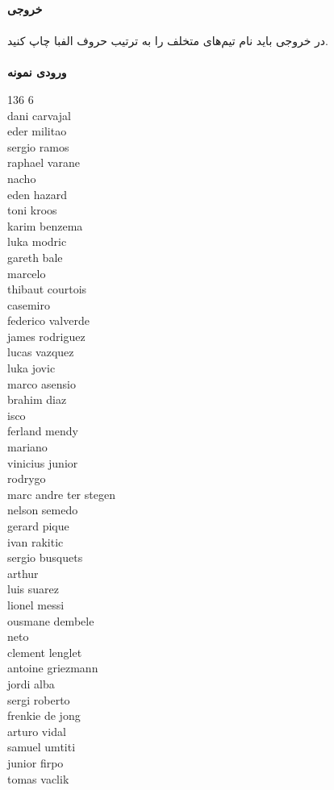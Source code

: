\documentclass[]{article}
\newcommand{\inputsample}[1]{
    ~\\
    \textbf{ورودی نمونه}
    ~\\
    \begin{tcolorbox}[breakable,boxrule=0pt]
        \begin{latin}
            \large{
                #1
            }
        \end{latin}
    \end{tcolorbox}
}
\begin{document}
\textbf{خروجی}
\\\\
در خروجی باید نام تیم‌های متخلف را به ترتیب حروف الفبا چاپ کنید.\\
\inputsample{
136 6\\
dani carvajal\\
eder militao\\
sergio ramos\\
raphael varane\\
nacho\\
eden hazard\\
toni kroos\\
karim benzema\\
luka modric\\
gareth bale\\
marcelo\\
thibaut courtois\\
casemiro\\
federico valverde\\
james rodriguez\\
lucas vazquez\\
luka jovic\\
marco asensio\\
brahim diaz\\
isco\\
ferland mendy\\
mariano\\
vinicius junior\\
rodrygo\\
marc andre ter stegen\\
nelson semedo\\
gerard pique\\
ivan rakitic\\
sergio busquets\\
arthur\\
luis suarez\\
lionel messi\\
ousmane dembele\\
neto\\
clement lenglet\\
antoine griezmann\\
jordi alba\\
sergi roberto\\
frenkie de jong\\
arturo vidal\\
samuel umtiti\\
junior firpo\\
tomas vaclik\\
}
\end{document}
